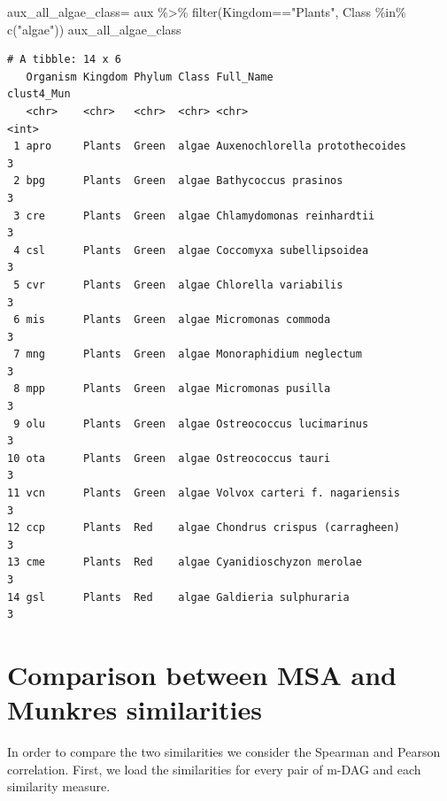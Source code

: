 \documentclass[
  letterpaper,
  DIV=11,
  numbers=noendperiod]{scrreprt}
\newenvironment{Shaded}{}{}
\newcommand{\DecValTok}[1]{\textcolor[rgb]{0.82,0.60,0.40}{#1}}
\newcommand{\FunctionTok}[1]{\textcolor[rgb]{0.38,0.69,0.94}{#1}}
\newcommand{\NormalTok}[1]{\textcolor[rgb]{0.67,0.70,0.75}{#1}}
\newcommand{\OtherTok}[1]{\textcolor[rgb]{0.15,0.68,0.38}{#1}}
\newcommand{\SpecialCharTok}[1]{\textcolor[rgb]{0.34,0.71,0.76}{#1}}
\newcommand{\StringTok}[1]{\textcolor[rgb]{0.60,0.76,0.47}{#1}}
\begin{document}
\begin{Shaded}
\begin{Highlighting}[]
\NormalTok{aux\_all\_algae\_class}\OtherTok{=}\NormalTok{ aux }\SpecialCharTok{\%\textgreater{}\%} 
  \FunctionTok{filter}\NormalTok{(Kingdom}\SpecialCharTok{==}\StringTok{"Plants"}\NormalTok{,}
\NormalTok{         Class }\SpecialCharTok{\%in\%} \FunctionTok{c}\NormalTok{(}\StringTok{"algae"}\NormalTok{))}
\NormalTok{aux\_all\_algae\_class}
\end{Highlighting}
\end{Shaded}

\begin{verbatim}
# A tibble: 14 x 6
   Organism Kingdom Phylum Class Full_Name                      clust4_Mun
   <chr>    <chr>   <chr>  <chr> <chr>                               <int>
 1 apro     Plants  Green  algae Auxenochlorella protothecoides          3
 2 bpg      Plants  Green  algae Bathycoccus prasinos                    3
 3 cre      Plants  Green  algae Chlamydomonas reinhardtii               3
 4 csl      Plants  Green  algae Coccomyxa subellipsoidea                3
 5 cvr      Plants  Green  algae Chlorella variabilis                    3
 6 mis      Plants  Green  algae Micromonas commoda                      3
 7 mng      Plants  Green  algae Monoraphidium neglectum                 3
 8 mpp      Plants  Green  algae Micromonas pusilla                      3
 9 olu      Plants  Green  algae Ostreococcus lucimarinus                3
10 ota      Plants  Green  algae Ostreococcus tauri                      3
11 vcn      Plants  Green  algae Volvox carteri f. nagariensis           3
12 ccp      Plants  Red    algae Chondrus crispus (carragheen)           3
13 cme      Plants  Red    algae Cyanidioschyzon merolae                 3
14 gsl      Plants  Red    algae Galdieria sulphuraria                   3
\end{verbatim}

\hypertarget{comparison-between-msa-and-munkres-similarities}{%
\section{Comparison between MSA and Munkres
similarities}\label{comparison-between-msa-and-munkres-similarities}}

In order to compare the two similarities we consider the Spearman and
Pearson correlation. First, we load the similarities for every pair of
m-DAG and each similarity measure.

\begin{Shaded}
\end{Shaded}
\end{document}
